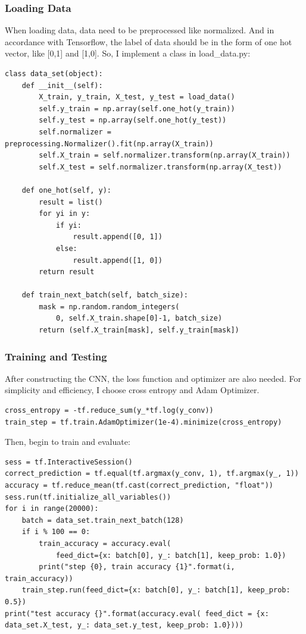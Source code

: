 \documentclass[a4paper]{article}
\begin{document}
            \subsubsection{Loading Data}
When loading data, data need to be preprocessed like normalized. And in accordance with Tensorflow, the label of data should be in the form of one hot vector, like [0,1] and [1,0]. So, I implement a class in load\_data.py:
\begin{verbatim}
class data_set(object):
    def __init__(self):
        X_train, y_train, X_test, y_test = load_data()
        self.y_train = np.array(self.one_hot(y_train))
        self.y_test = np.array(self.one_hot(y_test))
        self.normalizer = preprocessing.Normalizer().fit(np.array(X_train))
        self.X_train = self.normalizer.transform(np.array(X_train))
        self.X_test = self.normalizer.transform(np.array(X_test))

    def one_hot(self, y):
        result = list()
        for yi in y:
            if yi:
                result.append([0, 1])
            else:
                result.append([1, 0])
        return result

    def train_next_batch(self, batch_size):
        mask = np.random.random_integers(
            0, self.X_train.shape[0]-1, batch_size)
        return (self.X_train[mask], self.y_train[mask])
\end{verbatim}
            \subsubsection{Training and Testing}
After constructing the CNN, the loss function and optimizer are also needed. For simplicity and efficiency, I choose cross entropy and Adam Optimizer.
\begin{verbatim}
cross_entropy = -tf.reduce_sum(y_*tf.log(y_conv))
train_step = tf.train.AdamOptimizer(1e-4).minimize(cross_entropy)
\end{verbatim}
Then, begin to train and evaluate:
\begin{verbatim}
sess = tf.InteractiveSession()
correct_prediction = tf.equal(tf.argmax(y_conv, 1), tf.argmax(y_, 1))
accuracy = tf.reduce_mean(tf.cast(correct_prediction, "float"))
sess.run(tf.initialize_all_variables())
for i in range(20000):
    batch = data_set.train_next_batch(128)
    if i % 100 == 0:
        train_accuracy = accuracy.eval(
            feed_dict={x: batch[0], y_: batch[1], keep_prob: 1.0})
        print("step {0}, train accuracy {1}".format(i, train_accuracy))
    train_step.run(feed_dict={x: batch[0], y_: batch[1], keep_prob: 0.5})
print("test accuracy {}".format(accuracy.eval( feed_dict = {x: data_set.X_test, y_: data_set.y_test, keep_prob: 1.0})))
\end{verbatim}
\end{document}
